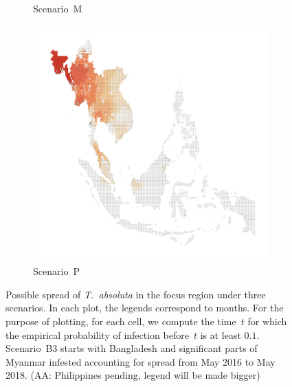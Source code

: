 \documentclass[11pt]{article}
\newcommand{\tuta}{\emph{T.~absoluta}}
\newcommand{\aacomment}[1]{({\color{magenta}AA: #1})}
\theoremstyle{definition}
\begin{document}
\begin{figure}[ht]
\begin{subfigure}[b]{.32\textwidth}
    \caption{Scenario~M\label{fig:spreadMYS}}
    \end{subfigure}
    \begin{subfigure}[b]{.32\textwidth}
        \includegraphics[width=\textwidth,trim={4cm 2cm 8cm 12cm},clip]{figs/spread_PHL.png}
    \caption{Scenario~P\label{fig:spreadPHL}}
    \end{subfigure}
    \caption{Possible spread of \tuta{} in the focus region under three
    scenarios. In each plot, the legends correspond to months. For the
    purpose of plotting, for each cell, we compute the time~$t$ for which
    the empirical probability of infection before~$t$ is at least $0.1$.
    Scenario~B3 starts with Bangladesh and significant parts of Myanmar
    infested accounting for spread from May 2016 to May 2018.
    \aacomment{Philippines pending, legend will be made bigger}}
\end{figure}

\end{document}
